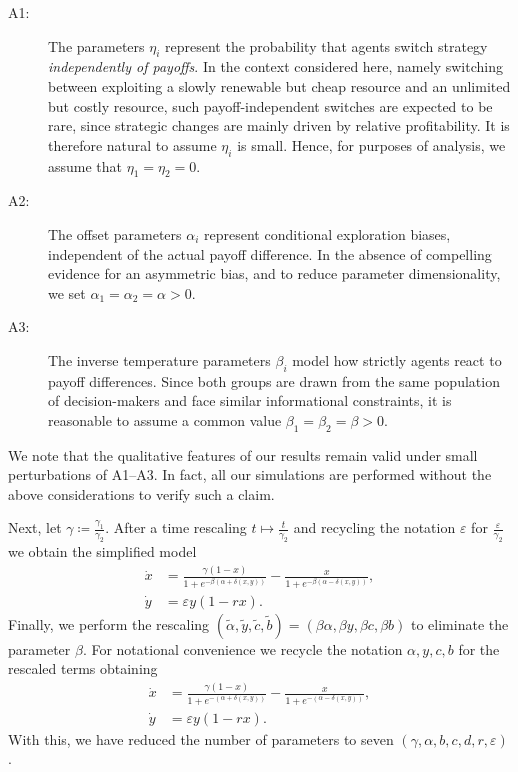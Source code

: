 \documentclass[3p]{elsarticle}
\theoremstyle{plain}
\theoremstyle{remark}
\theoremstyle{definition}
\begin{document}
\begin{description}
    \item[A1:]  The parameters $\eta_i$
 represent the probability that agents switch strategy \emph{independently of payoffs}. In the context considered here, namely switching between exploiting a slowly renewable but cheap resource and an unlimited but costly resource, such payoff-independent switches are expected to be rare, since strategic changes are mainly driven by relative profitability. It is therefore natural to assume $\eta_i$ is small. Hence, for purposes of analysis, we assume that $\eta_1=\eta_2=0$.
 \item[A2:] The offset parameters $\alpha_i$ represent conditional exploration biases, independent of the actual payoff difference. In the absence of compelling evidence for an asymmetric bias, and to reduce parameter dimensionality, we set $\alpha_1=\alpha_2=\alpha>0$. 
 \item[A3:] The inverse temperature parameters $\beta_i$ model how strictly agents react to payoff differences. Since both groups are drawn from the same population of decision-makers and face similar informational constraints, it is reasonable to assume a common value $\beta_1=\beta_2=\beta>0$.
\end{description}

We note that the qualitative features of our results remain valid under small perturbations of A1–A3. In fact, all our simulations are performed without the above considerations to verify such a claim.

Next, let $\gamma\coloneqq\frac{\gamma_1}{\gamma_2}$. After a time rescaling $t\mapsto \frac{t}{\gamma_2}$ and recycling the notation $\varepsilon$ for $\frac{\varepsilon}{\gamma_2}$ we obtain the simplified model
\begin{equation}
    \begin{split}
        \dot{x} &=   \frac{\gamma(1-x)}{1+e^{-\beta(\alpha + \delta(x,y))}}  -    \frac{x}{1+e^{-\beta(\alpha - \delta(x,y))}}, \\
            \dot{y} &= \varepsilon y (1-rx).
    \end{split}
\end{equation}
Finally, we perform the rescaling  $(\tilde\alpha,\tilde y, \tilde c, \tilde b)=(\beta\alpha,\beta y,\beta c,\beta b)$ to eliminate the parameter $\beta$. For notational convenience we recycle the notation $\alpha,y,c,b$ for the rescaled terms obtaining
\begin{equation}\label{eq:main2}
    \begin{split}
        \dot{x} &=   \frac{\gamma(1-x)}{1+e^{-(\alpha + \delta(x,y))}}  -    \frac{x}{1+e^{-(\alpha - \delta(x,y))}}, \\
            \dot{y} &= \varepsilon y (1-rx).
    \end{split}
\end{equation}
%
With this, we have reduced the number of parameters to seven $(\gamma,\alpha,b,c,d,r,\varepsilon)$.
\end{document}
